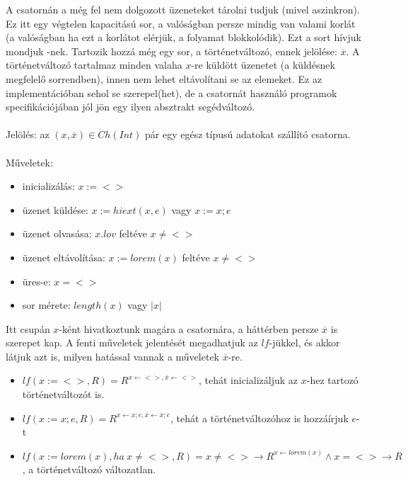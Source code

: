 \documentclass{article}
\begin{document}
A csatornán a még fel nem dolgozott üzeneteket tárolni tudjuk (mivel aszinkron). Ez itt egy végtelen kapacitású sor, a valóságban persze mindig van valami korlát (a valóságban ha ezt a korlátot elérjük, a folyamat blokkolódik). Ezt a sort hívjuk mondjuk -nek. Tartozik hozzá még egy sor, a történetváltozó, ennek jelölése: $\overline{x}$. A történetváltozó tartalmaz minden valaha $x$-re küldött üzenetet (a küldésnek megfelelő sorrendben), innen nem lehet eltávolítani se az elemeket. Ez az implementációban sehol se szerepel(het), de a csatornát használó programok specifikációjában jól jön egy ilyen absztrakt segédváltozó.
\\\\
Jelölés: az $(x, \overline{x}) \in Ch(Int)$ pár egy egész típusú adatokat szállító csatorna.
\\\\
Műveletek:
\begin{itemize}
\item inicializálás: $x:=<>$
\item üzenet küldése: $x:=hiext(x,e)$ vagy $x:=x;e$
\item üzenet olvasása: $x.lov$ feltéve $x \neq <>$
\item üzenet eltávolítása: $x:=lorem(x)$ feltéve $x \neq <>$
\item üres-e: $x = <>$
\item sor mérete: $length(x)$ vagy $|x|$
\end{itemize}
Itt csupán $x$-ként hivatkoztunk magára a csatornára, a háttérben persze $\overline{x}$ is szerepet kap. A fenti műveletek jelentését megadhatjuk az $lf$-jükkel, és akkor látjuk azt is, milyen hatással vannak a műveletek $\overline{x}$-re.
\begin{itemize}
\item $lf(x:=<>,R) = R^{x\leftarrow<>,\overline{x}\leftarrow<>}$, tehát inicializáljuk az $x$-hez tartozó történetváltozót is.
\item $lf(x:=x;e,R) = R^{x \leftarrow{x} ; e, \overline{x} \leftarrow \overline{x} ; e}$, tehát a történetváltozóhoz is hozzáírjuk $e$-t
\item $lf(x:=lorem(x), ha\ x\neq <>,R) = x\neq <> \rightarrow R ^{x\leftarrow lorem(x)} \land x = <> \rightarrow R$, a történetváltozó változatlan.
\end{itemize}
\end{document}
